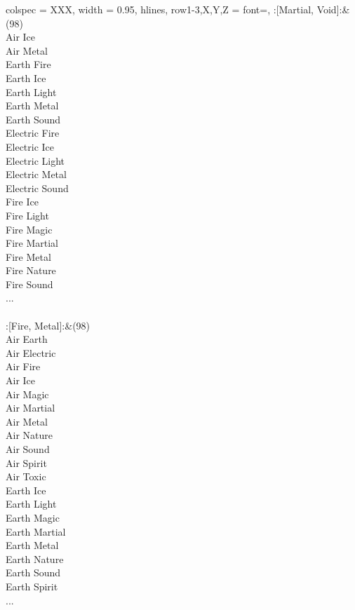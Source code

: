 \begin{longtblr}[
	caption = {2v2 Attacking Effective},
	label = {2v2-Attacking-Effective},
]{
	colspec = {XXX}, width = 0.95\linewidth,
	hlines,
	row{1-3,X,Y,Z} = {font=\bfseries},
}
	:[Martial, Void]:&{(98)\\
	Air Ice \\
	Air Metal \\
	Earth Fire \\
	Earth Ice \\
	Earth Light \\
	Earth Metal \\
	Earth Sound \\
	Electric Fire \\
	Electric Ice \\
	Electric Light \\
	Electric Metal \\
	Electric Sound \\
	Fire Ice \\
	Fire Light \\
	Fire Magic \\
	Fire Martial \\
	Fire Metal \\
	Fire Nature \\
	Fire Sound \\
	...\\
	}\\

	:[Fire, Metal]:&{(98)\\
	Air Earth \\
	Air Electric \\
	Air Fire \\
	Air Ice \\
	Air Magic \\
	Air Martial \\
	Air Metal \\
	Air Nature \\
	Air Sound \\
	Air Spirit \\
	Air Toxic \\
	Earth Ice \\
	Earth Light \\
	Earth Magic \\
	Earth Martial \\
	Earth Metal \\
	Earth Nature \\
	Earth Sound \\
	Earth Spirit \\
	...\\
	}\\


\end{longtblr}
